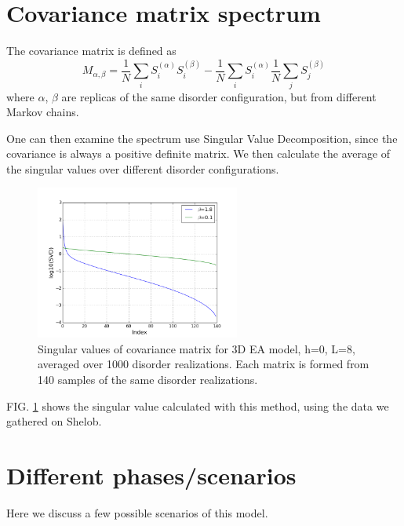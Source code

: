 \section{Covariance matrix spectrum}
The covariance matrix is defined as 
\[
M_{\alpha,\beta}=\frac{1}{N}\sum_iS_i^{(\alpha)}S_i^{(\beta)}-
\frac{1}{N}\sum_iS_i^{(\alpha)}\frac{1}{N}\sum_jS_j^{(\beta)}
\]
where $\alpha$, $\beta$ are replicas of the same disorder configuration, 
but from different Markov chains.

One can then examine the spectrum use Singular Value Decomposition, since
the covariance is always a positive definite matrix. 
We then calculate the average of the singular values over different disorder 
configurations. 

\begin{figure}[ht]
  \centering
  \includegraphics[width=0.6\textwidth]{img/matrix/svd_data.png}
  \caption{Singular values of covariance matrix for 3D EA model, h=0, L=8, 
averaged over 1000 disorder realizations. 
Each matrix is formed from 140 samples of the same disorder realizations.}
  \label{fig:exp}
\end{figure}

FIG. \ref{fig:exp} shows the singular value calculated with this method, using
the data we gathered on Shelob.

\section{Different phases/scenarios}
Here we discuss a few possible scenarios of this model.

